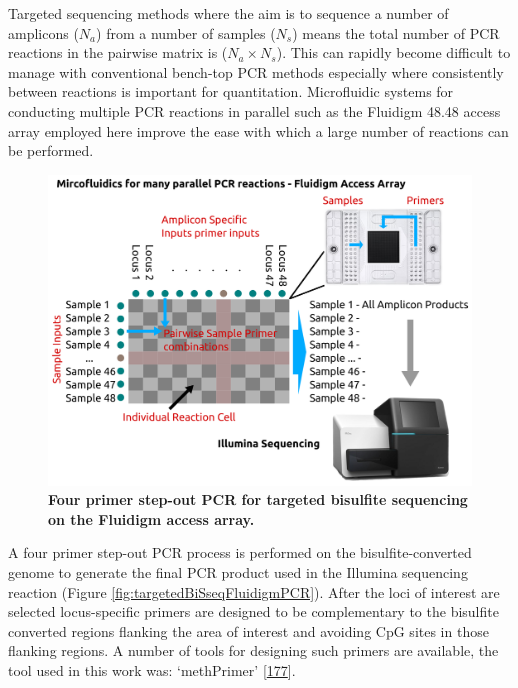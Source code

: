 \documentclass[
]{book}
\begin{document}
Targeted sequencing methods where the aim is to sequence a number of amplicons (\(N_a\)) from a number of samples (\(N_s\)) means the total number of PCR reactions in the pairwise matrix is (\(N_a \times N_s\)).
This can rapidly become difficult to manage with conventional bench-top PCR methods especially where consistently between reactions is important for quantitation.
Microfluidic systems for conducting multiple PCR reactions in parallel such as the Fluidigm 48.48 access array employed here improve the ease with which a large number of reactions can be performed.

\begin{figure}

{\centering \includegraphics[width=0.6\linewidth]{figs/targeted_BiSseq_fluidigm_generic} 

}

\caption{\textbf{Four primer step-out PCR for targeted bisulfite sequencing on the Fluidigm access array.}}\label{fig:targetedBiSseqFluidigmGeneric}
\end{figure}



A four primer step-out PCR process is performed on the bisulfite-converted genome to generate the final PCR product used in the Illumina sequencing reaction (Figure \ref{fig:targetedBiSseqFluidigmPCR}).
After the loci of interest are selected locus-specific primers are designed to be complementary to the bisulfite converted regions flanking the area of interest and avoiding CpG sites in those flanking regions.
A number of tools for designing such primers are available, the tool used in this work was: `methPrimer' {[}\protect\hyperlink{ref-Li2002}{177}{]}.
\end{document}
